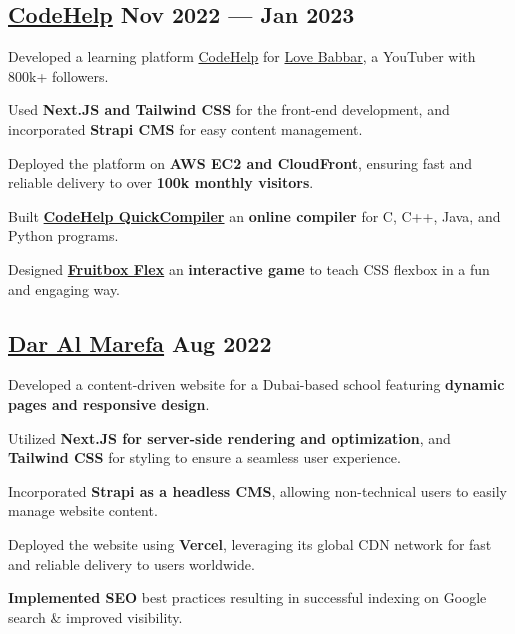 \subsection{{\href{https://www.thecodehelp.in/}{CodeHelp} \hfill Nov 2022 --- Jan 2023}}
\begin{zitemize}
\item Developed a learning platform \href{https://www.thecodehelp.in/}{CodeHelp} for \href{https://www.youtube.com/@LoveBabbar}{Love Babbar}, a YouTuber with 800k+ followers.
\item Used \textbf{Next.JS and Tailwind CSS} for the front-end development, and incorporated \textbf{Strapi CMS} for easy content management.
\item Deployed the platform on \textbf{AWS EC2 and CloudFront}, ensuring fast and reliable delivery to over \textbf{100k monthly visitors}.
\item Built \href{https://codehelp-labs.vercel.app/quick-compiler}{\textbf{CodeHelp QuickCompiler}} an \textbf{online compiler} for C, C++, Java, and Python programs.
\item Designed \href{https://games.thecodehelp.in/}{\textbf{Fruitbox Flex}} an  \textbf{interactive game} to teach CSS flexbox in a fun and engaging way.
\end{zitemize}

\subsection{{\href{https://www.daralmarefa.ae/}{Dar Al Marefa} \hfill Aug 2022}}
\begin{zitemize}
\item Developed a content-driven website for a Dubai-based school featuring \textbf{dynamic pages and responsive design}.
\item Utilized \textbf{Next.JS for server-side rendering and optimization}, and \textbf{Tailwind CSS} for styling to ensure a seamless user experience.
\item Incorporated \textbf{Strapi as a headless CMS}, allowing non-technical users to easily manage website content.
\item Deployed the website using \textbf{Vercel}, leveraging its global CDN network for fast and reliable delivery to users worldwide. 
\item \textbf{Implemented SEO} best practices resulting in successful indexing on Google search \& improved visibility.
\end{zitemize}

